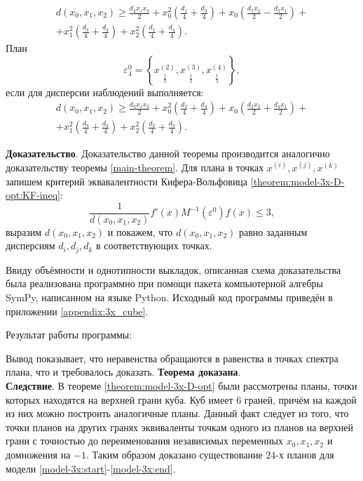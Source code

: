 \begin{theorem}
	\begin{multline}\label{theorem:model-3x-D-opt:plan-3-d}
	d(x_0, x_1, x_2) \ge \frac{d_{4} x_{1} x_{2}}{2} + x_{0}^{2} \left(\frac{d_{1}}{4} + \frac{d_{3}}{4}\right) + x_{0} \left(\frac{d_{1} x_{2}}{2} - \frac{d_{3} x_{1}}{2}\right) + \\ + x_{1}^{2} \left(\frac{d_{3}}{4} + \frac{d_{4}}{4}\right) + x_{2}^{2} \left(\frac{d_{1}}{4} + \frac{d_{4}}{4}\right).
	\end{multline}
	План 
	\begin{equation} \label{theorem:model-3x-D-opt:plan-4}
	\varepsilon_4^{0} = \left \{ 
	\underset{\frac 1 3} {x^{(2)}},
	\underset{\frac 1 3} {x^{(3)}},
	\underset{\frac 1 3} {x^{(4)}}
	\right \},
	\end{equation}
	если для дисперсии наблюдений выполняется:
	\begin{multline}\label{theorem:model-3x-D-opt:plan-4-d}
	d(x_0, x_1, x_2) \ge \frac{d_{3} x_{1} x_{2}}{2} + x_{0}^{2} \left(\frac{d_{2}}{4} + \frac{d_{4}}{4}\right) + x_{0} \left(\frac{d_{2} x_{2}}{2} + \frac{d_{4} x_{1}}{2}\right) + \\ + x_{1}^{2} \left(\frac{d_{3}}{4} + \frac{d_{4}}{4}\right) + x_{2}^{2} \left(\frac{d_{2}}{4} + \frac{d_{3}}{4}\right).
	\end{multline}		
\end{theorem}

\textbf{Доказательство}. Доказательство данной теоремы производится аналогично доказательству теоремы \ref{main-theorem}. Для плана в точках $x^{(i)}, x^{(j)}, x^{(k)}$ запишем критерий эквавалентности Кифера-Вольфовица \eqref{theorem:model-3x-D-opt:KF-ineq}:
\begin{equation}\label{theorem:model-3x-D-opt:KF-ineq}
\frac{1}{d(x_0, x_1, x_2)} f'(x) M^{-1}(\varepsilon^0) f(x) \le 3,
\end{equation}
выразим $d(x_0, x_1, x_2)$ и покажем, что $d(x_0, x_1, x_2)$ равно заданным дисперсиям $d_i, d_j, d_k$ в соответствующих точках.

Ввиду объёмности и однотипности выкладок, описанная схема доказательства была реализована программно при помощи пакета компьютерной алгебры SymPy, написанном на языке Python. Исходный код программы приведён в приложении \ref{appendix:3x_cube}.

Результат работы программы:

Вывод показывает, что неравенства обращаются в равенства в точках спектра плана, что и требовалось доказать. \textbf{Теорема доказана}.\\

\textbf{Следствие}.
В теореме \ref{theorem:model-3x-D-opt} были рассмотрены планы, точки которых находятся на верхней грани куба. Куб имеет 6 граней, причём на каждой из них можно построить аналогичные планы. Данный факт следует из того, что точки планов на других гранях эквиваленты точкам одного из планов на верхней грани с точностью до переименования независимых переменных $x_0, x_1, x_2$ и домножения на $-1$. Таким образом доказано существование $24$-х планов для модели \eqref{model-3x:start}-\eqref{model-3x:end}.	

